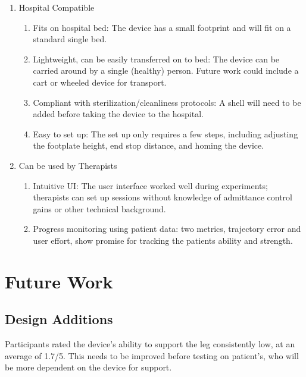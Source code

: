 \documentclass[12pt]{report}
\begin{document}
\begin{enumerate}[label*=\arabic*.]
\begin{enumerate}[label*=\arabic*.]
	\end{enumerate}
	\item Hospital Compatible
	\begin{enumerate}[label*=\arabic*.]
		\item Fits on hospital bed: The device has a small footprint and will fit on a standard single bed. 
		\item Lightweight, can be easily transferred on to bed: The device can be carried around by a single (healthy) person. Future work could include a cart or wheeled device for transport. 
		\item Compliant with sterilization/cleanliness protocols: A shell will need to be added before taking the device to the hospital.
		\item Easy to set up: The set up only requires a few steps, including adjusting the footplate height, end stop distance, and homing the device. 
	\end{enumerate}
	\item Can be used by Therapists
	\begin{enumerate}[label*=\arabic*.]
		\item Intuitive UI: The user interface worked well during experiments; therapists can set up sessions without knowledge of admittance control gains or other technical background.
		\item Progress monitoring using patient data: two metrics, trajectory error and user effort, show promise for tracking the patients ability and strength. 
	\end{enumerate}
	\end{enumerate}


	\section{Future Work} \label{sec:future_work}
	
	\subsection{Design Additions}
	
	Participants rated the device's ability to support the leg consistently low, at an average of 1.7/5. This needs to be improved before testing on patient's, who will be more dependent on the device for support. 
	
\end{document}
